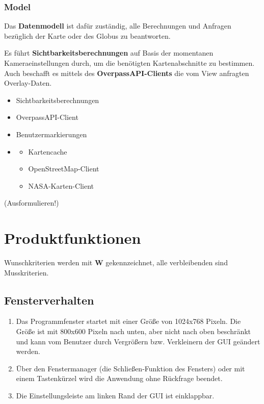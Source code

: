 \documentclass[10pt]{scrreprt}
\begin{document}
\subsection*{Model}
Das \textbf{Datenmodell} ist dafür zuständig, alle Berechnungen und Anfragen bezüglich der Karte oder des Globus zu beantworten.

Es führt \textbf{Sichtbarkeitsberechnungen} auf Basis der momentanen Kameraeinstellungen durch, um die benötigten Kartenabschnitte zu bestimmen.
Auch beschafft es mittels des \textbf{OverpassAPI-Clients} die vom View anfragten Overlay-Daten.

\begin{itemize}
\item Sichtbarkeitsberechnungen
\item OverpassAPI-Client
\item Benutzermarkierungen
\item \begin{itemize}
\item Kartencache
\item OpenStreetMap-Client
\item NASA-Karten-Client
\end{itemize}
\end{itemize}
\vspace{1cm}(Ausformulieren!)


\chapter{Produktfunktionen}

\renewcommand{\labelenumi}{\textbf{/F\numprint{\theenumi}0/}}

\newcommand{\W}{\textbf{W }}
Wunschkriterien werden mit \W  gekennzeichnet, alle verbleibenden sind Musskriterien.

\section{Fensterverhalten}
\begin{enumerate}[leftmargin=2cm]
\item Das Programmfenster startet mit einer Größe von 1024x768 Pixeln. Die Größe ist mit 800x600 Pixeln nach unten, aber nicht nach oben beschränkt und kann vom Benutzer durch Vergrößern bzw. Verkleinern der GUI geändert werden.
\item Über den Fenstermanager (die Schließen-Funktion des Fensters) oder mit einem Tastenkürzel wird die Anwendung ohne Rückfrage beendet.
\item Die Einstellungsleiste am linken Rand der GUI ist einklappbar.
\end{enumerate}
\end{document}
